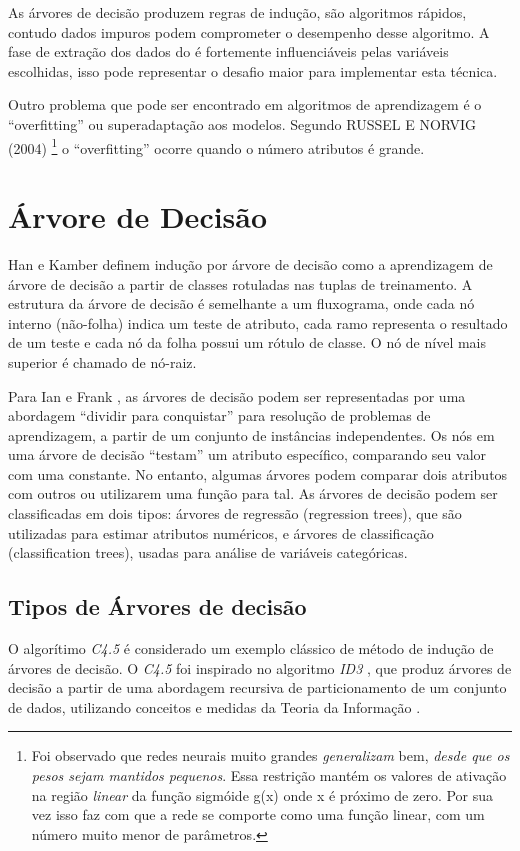 As árvores de decisão produzem regras de indução, são algoritmos rápidos, contudo dados impuros podem comprometer o desempenho desse algoritmo. 
A fase de extração dos dados do é fortemente influenciáveis pelas variáveis escolhidas, \cite{DecisionTree} 
isso pode representar o desafio maior para implementar esta técnica. 

Outro problema que pode ser encontrado em algoritmos de aprendizagem é o ``overfitting'' ou superadaptação aos modelos.
Segundo RUSSEL E NORVIG (2004)  \footnote{Foi observado que redes neurais muito grandes \textit{generalizam} bem, 
\textit{desde que os pesos sejam mantidos pequenos}. Essa restrição mantém os valores de ativação na região 
\textit{linear} da função sigmóide g(x) onde x é próximo de zero. Por sua vez isso faz com que a rede se comporte 
como uma função linear, com um número muito menor de parâmetros.} o ``overfitting'' ocorre quando o número atributos é grande.



\pagebreak

\section{Árvore de Decisão}

Han e Kamber \cite{DataMining} definem indução por árvore de decisão como a aprendizagem de árvore de decisão a partir de classes rotuladas nas tuplas de treinamento. 
A estrutura da árvore de decisão é semelhante a um fluxograma, onde cada nó interno (não-folha) indica um teste de atributo, cada ramo representa o resultado de um teste e 
cada nó da folha possui um rótulo de classe. O nó de nível mais superior é chamado de nó-raiz.


Para Ian e Frank \cite{MachineLearning}, as árvores de decisão podem ser representadas por uma abordagem ``dividir para conquistar'' para resolução de problemas de 
aprendizagem, a partir de um conjunto de instâncias independentes. Os nós em uma árvore de decisão ``testam'' um atributo específico, comparando seu valor com uma constante.
No entanto, algumas árvores podem comparar dois atributos com outros ou utilizarem uma função para tal.
As árvores de decisão podem ser classificadas em dois tipos: árvores de regressão (regression trees), que são utilizadas para estimar atributos numéricos, e árvores de 
classificação (classification trees), usadas para análise de variáveis categóricas.


\subsection{Tipos de Árvores de decisão}
O algorítimo \textit{C4.5} é considerado um exemplo clássico de método de indução de árvores de decisão. O \textit{C4.5} \cite{Learning2007} foi inspirado no algoritmo 
\textit{ID3} \cite{Learning1979}, que produz árvores de decisão a partir de uma abordagem recursiva de particionamento de um conjunto de dados, utilizando conceitos e medidas 
da Teoria da Informação \cite{TeoriaInf}.

